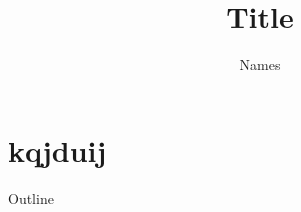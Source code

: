 \documentclass{beamer}
\title{Title}
\author{Names}
\institute{INSTITUTE}
\date{}
\begin{document}
\begin{frame}
    \titlepage
\end{frame}

\section*{kqjduij}
\begin{frame}{Outline}
    \tableofcontents
\end{frame}
\end{document}
